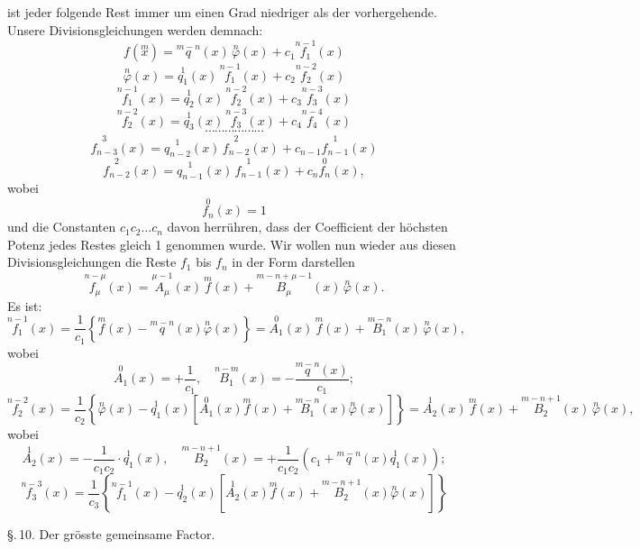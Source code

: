 \documentclass[11pt]{article}
\providecommand{\weberpage}[1]{}
\providecommand{\weq}[2]{\begin{equation}\tag{#1}#2\end{equation}}
\begin{document}
\weberpage{134}
ist jeder folgende Rest immer um einen Grad niedriger als der vorhergehende.
Unsere Divisionsgleichungen werden demnach:
\[ f(\overset{m}{x}) = \overset{m-n}{q}(x)\, \overset{n}{\varphi}(x) + c_1 \overset{n-1}{f_1}(x) \]
\[ \overset{n}{\varphi}(x) = \overset{1}{q_1}(x)\, \overset{n-1}{f_1}(x) + c_2 \overset{n-2}{f_2}(x) \]
\[ \overset{n-1}{f_1}(x) = \overset{1}{q_2}(x)\, \overset{n-2}{f_2}(x) + c_3 \overset{n-3}{f_3}(x) \]
\[ \overset{n-2}{f_2}(x) = \overset{1}{q_3}(x)\, \overset{n-3}{f_3}(x) + c_4 \overset{n-4}{f_4}(x) \]
\[ \cdots\cdots\cdots\cdots\cdots\cdots \]
\[ \overset{3}{f_{n-3}}(x) = \overset{1}{q_{n-2}}(x)\, \overset{2}{f_{n-2}}(x) + c_{n-1} \overset{1}{f_{n-1}}(x) \]
\[ \overset{2}{f_{n-2}}(x) = \overset{1}{q_{n-1}}(x)\, \overset{1}{f_{n-1}}(x) + c_n \overset{0}{f_n}(x), \]
wobei
\[ \overset{0}{f_n}(x) = 1 \]
und die Constanten $c_1 c_2 \ldots c_n$ davon herrühren, dass der Coefficient der höchsten Potenz jedes Restes gleich 1 genommen wurde. Wir wollen nun wieder aus diesen Divisionsgleichungen die Reste $f_1$ bis $f_n$ in der Form darstellen
\weq{I}{ \overset{n-\mu}{f_\mu}(x) = \overset{\mu-1}{A_\mu}(x)\, \overset{m}{f}(x) + \overset{m-n+\mu-1}{B_\mu}(x)\, \overset{n}{\varphi}(x). }
Es ist:
\weq{1}{ \overset{n-1}{f_1}(x) = \frac{1}{c_1}\left\{ \overset{m}{f}(x) - \overset{m-n}{q}(x)\overset{n}{\varphi}(x) \right\} = \overset{0}{A_1}(x)\,\overset{m}{f}(x) + \overset{m-n}{B_1}(x)\,\overset{n}{\varphi}(x), }
wobei
\[ \overset{0}{A_1}(x) = +\frac{1}{c_1}, \quad \overset{n-m}{B_1}(x) = -\frac{\overset{m-n}{q}(x)}{c_1}; \]
\weq{2}{ \overset{n-2}{f_2}(x) = \frac{1}{c_2}\left\{ \overset{n}{\varphi}(x) - \overset{1}{q_1}(x)\left[ \overset{0}{A_1}(x)\overset{m}{f}(x) + \overset{m-n}{B_1}(x)\overset{n}{\varphi}(x) \right] \right\} = \overset{1}{A_2}(x)\,\overset{m}{f}(x) + \overset{m-n+1}{B_2}(x)\,\overset{n}{\varphi}(x), }
wobei
\[ \overset{1}{A_2}(x) = -\frac{1}{c_1c_2}\cdot \overset{1}{q_1}(x), \quad \overset{m-n+1}{B_2}(x) = +\frac{1}{c_1c_2}\left( c_1 + \overset{m-n}{q}(x)\overset{1}{q_1}(x) \right); \]
\weq{3}{ \overset{n-3}{f_3}(x) = \frac{1}{c_3}\left\{ \overset{n-1}{f_1}(x) - \overset{1}{q_2}(x)\left[ \overset{1}{A_2}(x)\overset{m}{f}(x) + \overset{m-n+1}{B_2}(x)\overset{n}{\varphi}(x) \right] \right\} }


\weberpage{135}
\S.\,10. Der grösste gemeinsame Factor.
\end{document}
